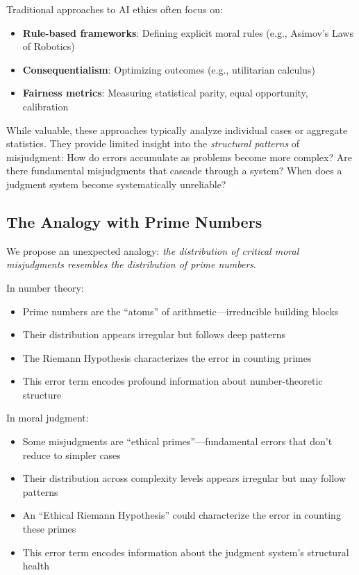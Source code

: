 \documentclass[12pt,a4paper]{article}
\theoremstyle{definition}
\theoremstyle{remark}
\begin{document}
Traditional approaches to AI ethics often focus on:
\begin{itemize}
    \item \textbf{Rule-based frameworks}: Defining explicit moral rules (e.g., Asimov's Laws of Robotics)
    \item \textbf{Consequentialism}: Optimizing outcomes (e.g., utilitarian calculus)
    \item \textbf{Fairness metrics}: Measuring statistical parity, equal opportunity, calibration
\end{itemize}

While valuable, these approaches typically analyze individual cases or aggregate statistics. They provide limited insight into the \emph{structural patterns} of misjudgment: How do errors accumulate as problems become more complex? Are there fundamental misjudgments that cascade through a system? When does a judgment system become systematically unreliable?

\subsection{The Analogy with Prime Numbers}

We propose an unexpected analogy: \emph{the distribution of critical moral misjudgments resembles the distribution of prime numbers}.

In number theory:
\begin{itemize}
    \item Prime numbers are the ``atoms'' of arithmetic---irreducible building blocks
    \item Their distribution appears irregular but follows deep patterns
    \item The Riemann Hypothesis characterizes the error in counting primes
    \item This error term encodes profound information about number-theoretic structure
\end{itemize}

In moral judgment:
\begin{itemize}
    \item Some misjudgments are ``ethical primes''---fundamental errors that don't reduce to simpler cases
    \item Their distribution across complexity levels appears irregular but may follow patterns
    \item An ``Ethical Riemann Hypothesis'' could characterize the error in counting these primes
    \item This error term encodes information about the judgment system's structural health
\end{itemize}
\end{document}
